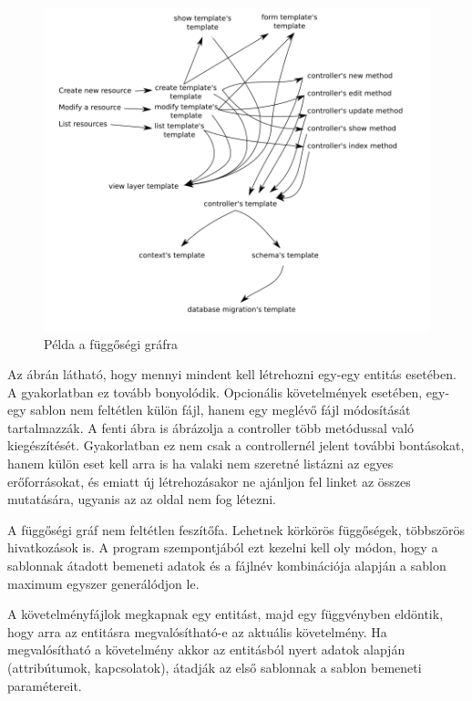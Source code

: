 \documentclass[a4paper,12pt,oneside]{report}
\begin{document}
\begin{justify}
	\begin{figure}[h]
		\includegraphics[width=\textwidth]{contents/images/dependecy_graph.png}
		\caption{Példa a függőségi gráfra}
		\label{fig:dependecy_graph}
	\end{figure}

	Az ábrán látható, hogy mennyi mindent kell létrehozni egy-egy entitás esetében. A gyakorlatban ez tovább bonyolódik. Opcionális követelmények esetében, egy-egy sablon nem feltétlen külön fájl, hanem egy meglévő fájl módosítását tartalmazzák. A fenti ábra is ábrázolja a controller több metódussal való kiegészítését. Gyakorlatban ez nem csak a controllernél jelent további bontásokat, hanem külön eset kell arra is ha valaki nem szeretné listázni az egyes erőforrásokat, és emiatt új létrehozásakor ne ajánljon fel linket az összes mutatására, ugyanis az az oldal nem fog létezni.

	A függőségi gráf nem feltétlen feszítőfa. Lehetnek körkörös függőségek, többszörös hivatkozások is. A program szempontjából ezt kezelni kell oly módon, hogy a sablonnak átadott bemeneti adatok és a fájlnév kombinációja alapján a sablon maximum egyszer generálódjon le.

	A követelményfájlok megkapnak egy entitást, majd egy függvényben eldöntik, hogy arra az entitásra megvalósítható-e az aktuális követelmény. Ha megvalósítható a követelmény akkor az entitásból nyert adatok alapján (attribútumok, kapcsolatok), átadják az első sablonnak a sablon bemeneti paramétereit.


\end{justify}
\end{document}
